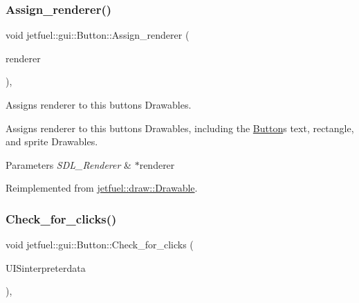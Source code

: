 \subsubsection{\texorpdfstring{Assign\+\_\+renderer()}{Assign\_renderer()}}
{\footnotesize\ttfamily void jetfuel\+::gui\+::\+Button\+::\+Assign\+\_\+renderer (\begin{DoxyParamCaption}\item[{S\+D\+L\+\_\+\+Renderer $\ast$}]{renderer }\end{DoxyParamCaption})\hspace{0.3cm}{\ttfamily [override]}, {\ttfamily [virtual]}}



Assigns renderer to this button\textquotesingle{}s Drawables. 

Assigns renderer to this button\textquotesingle{}s Drawables, including the \hyperlink{classjetfuel_1_1gui_1_1Button}{Button}\textquotesingle{}s text, rectangle, and sprite Drawables.


\begin{DoxyParams}{Parameters}
{\em S\+D\+L\+\_\+\+Renderer} & $\ast$renderer \\
\hline
\end{DoxyParams}


Reimplemented from \hyperlink{classjetfuel_1_1draw_1_1Drawable_a0d7257f197d6ffcdd89c3a99c93d1400}{jetfuel\+::draw\+::\+Drawable}.

\mbox{\label{classjetfuel_1_1gui_1_1Button_ab80239583f2e515370a90771976c5265}} 
\subsubsection{\texorpdfstring{Check\+\_\+for\+\_\+clicks()}{Check\_for\_clicks()}}
{\footnotesize\ttfamily void jetfuel\+::gui\+::\+Button\+::\+Check\+\_\+for\+\_\+clicks (\begin{DoxyParamCaption}\item[{\hyperlink{structjetfuel_1_1control_1_1Action}{jetfuel\+::control\+::\+Action}}]{U\+I\+Sinterpreterdata }\end{DoxyParamCaption})\hspace{0.3cm}{\ttfamily [override]}, {\ttfamily [virtual]}}



